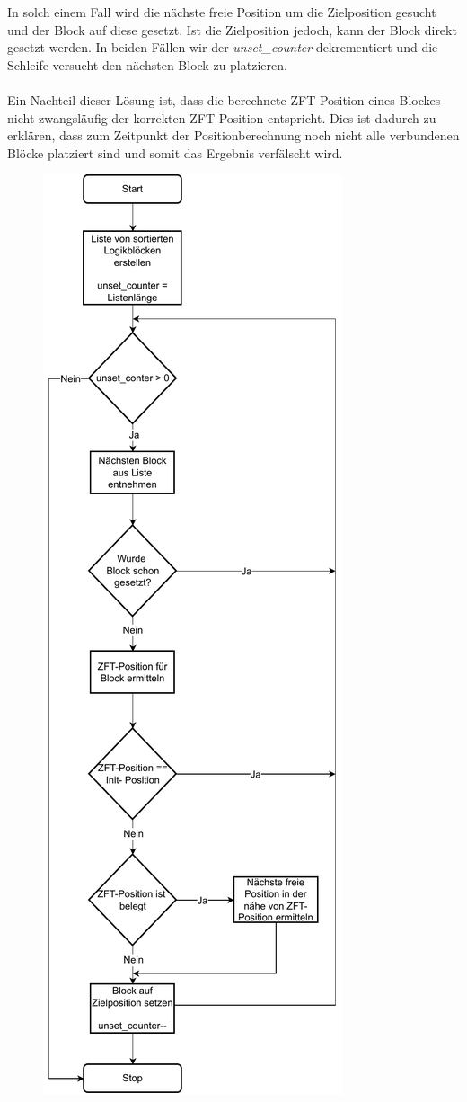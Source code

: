         In solch einem Fall wird die nächste freie Position um die Zielposition gesucht und der
        Block auf diese gesetzt. Ist die Zielposition jedoch, kann der Block direkt gesetzt werden.
        In beiden Fällen wir der \textit{unset\_counter} dekrementiert und die Schleife versucht den nächsten Block
        zu platzieren.
        \\\\
        Ein Nachteil dieser Lösung ist, dass die berechnete ZFT-Position eines Blockes nicht zwangsläufig
        der korrekten ZFT-Position entspricht. Dies ist dadurch zu erklären, dass zum Zeitpunkt der
        Positionberechnung noch nicht alle verbundenen Blöcke platziert sind und somit das Ergebnis
        verfälscht wird.


        \begin{figure}[H]
            \centering
            \includegraphics[scale=0.6]{img/init-flowchart.pdf}

\end{figure}
